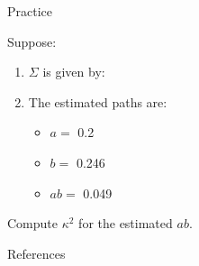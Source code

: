 \documentclass{beamer}
\newcommand{\va}[0]{\vspace{12pt}}
\newcommand{\vb}[0]{\vspace{6pt}}
\begin{document}
\begin{frame}{Practice}
  


Suppose:
\begin{enumerate}
\item $\Sigma$ is given by:

\va
\item The estimated paths are:
  \begin{itemize}
  \item $a = $ 0.2
    \vb
  \item $b = $ 0.246
    \vb
  \item $ab = $ 0.049
  \end{itemize}
  \end{enumerate}
  \va
  Compute $\kappa^2$ for the estimated $ab$.
  
\end{frame}

\begin{frame}{References}


\end{frame}
\end{document}
